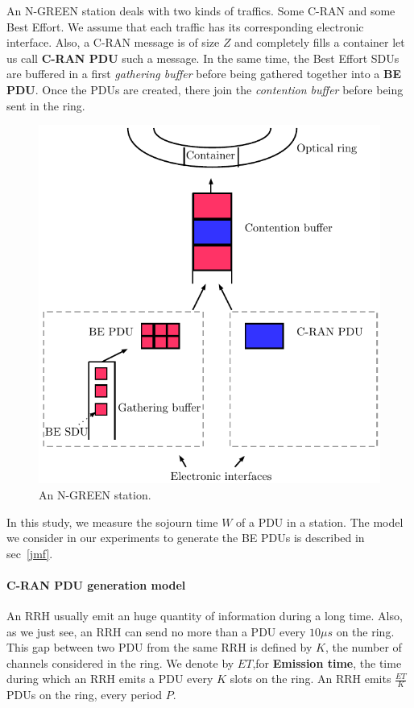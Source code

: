 \documentclass[]{algotel}
\begin{document}
  
      An N-GREEN station deals with two kinds of traffics. Some C-RAN and some Best Effort. We assume that each traffic has its corresponding electronic interface. Also, a C-RAN message is of size $Z $ and completely fills a container let us call {\bf C-RAN PDU} such a message. In the same time, the Best Effort SDUs are buffered in a first {\em gathering buffer} before being gathered together into a {\bf BE PDU}. Once the PDUs are created, there join the {\em contention buffer} before being sent in the ring.
      \begin{figure}[h!]
\begin{center}   
  \includegraphics[scale=0.7]{buffers.pdf}
     \caption{An N-GREEN station.}
     
\end{center}
  \end{figure}
  
 In this study, we measure the sojourn time $W$ of a PDU in a station. The model we consider in our experiments to generate the BE PDUs is described in sec~\ref{jmf}.
  
 \paragraph{C-RAN PDU generation model} An RRH usually emit an huge quantity of information during a long time. Also, as we just see, an RRH can send no more than a PDU every $10\mu s$ on the ring. This gap between two PDU from the same RRH is defined by $K$, the number of channels considered in the ring.
 We denote by $ET$,for {\bf Emission time}, the time during which an RRH emits a PDU every $K$ slots on the ring. An RRH emits $\frac{ET}{K}$ PDUs on the ring, every period $P$.
    	    
\end{document}
